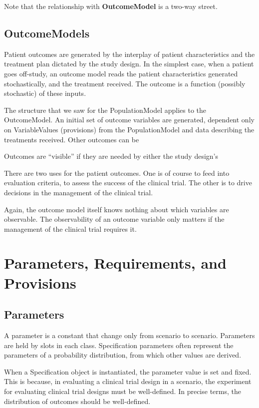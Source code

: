 \documentclass[12pt]{amsart}
\def\code<#1>{\textbf{#1}}
\begin{document}
Note that the relationship with \code<OutcomeModel> is a two-way street.


\subsection{ OutcomeModels}

Patient outcomes are generated
by the interplay of patient characteristics and the treatment plan
dictated by the study design.
In the simplest case, 
when a patient goes off-study,
an outcome  model reads the patient characteristics generated stochastically,
and the treatment received.
The outcome is a function (possibly stochastic)
of these inputs.


The structure that we saw for the PopulationModel applies to the OutcomeModel.
An initial set of outcome variables are generated,
dependent only on VariableValues (provisions) from the PopulationModel
and data describing the treatments received.
Other outcomes can be 

Outcomes are  ``visible'' if they are needed by either
the study design's 

There are two uses for the patient outcomes.  One is of course to feed into
evaluation criteria, to assess the success of the clinical trial. The other is to 
drive decisions in the management of the clinical trial.

Again, the outcome model itself knows nothing about which variables 
are observable. The observability of an outcome variable only matters   
if the management of the clinical trial requires it.



\section{Parameters, Requirements, and Provisions}


\subsection{Parameters }
A parameter is a constant that change only from scenario to scenario.  
Parameters are held by slots in each class.
Specification parameters often represent the parameters of a probability distribution,
from which other values are derived.

When a Specification object is instantiated, the parameter value is set and fixed.
This is because, in evaluating a clinical trial design in a scenario, 
the experiment for evaluating clinical trial designs must be well-defined.
In precise terms, the distribution of
outcomes should be well-defined.
\end{document}
